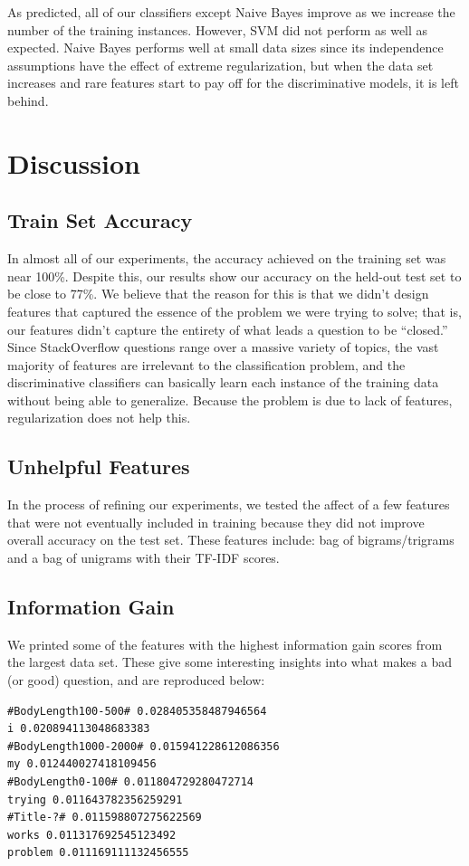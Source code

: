\documentclass[11pt]{article}
\begin{document}
As predicted, all of our classifiers except Naive Bayes improve as we increase the number
of the training instances. However, SVM did not perform as well as
expected. Naive Bayes performs well at small data sizes since its independence assumptions have the effect of extreme regularization, but when the data set increases and rare features start to pay off for the discriminative models, it is left behind.

\section{Discussion}

\subsection{Train Set Accuracy}
In almost all of our experiments, the accuracy achieved on the
training set was near 100\%.  Despite this, our results show our
accuracy on the held-out test set to be close to 77\%.  We believe
that the reason for this is that we didn't design features that
captured the essence of the problem we were trying to solve; that is,
our features didn't capture the entirety of what leads a question to
be ``closed.'' Since StackOverflow questions range over a massive variety of topics, the vast majority of features are irrelevant to the classification problem, and the discriminative classifiers can basically learn each instance of the training data without being able to generalize. Because the problem is due to lack of features, regularization does not help this.

\subsection{Unhelpful Features}
In the process of refining our experiments, we tested the affect of a
few features that were not eventually included in training because
they did not improve overall accuracy on the test set. These features
include: bag of bigrams/trigrams and a bag of unigrams with their
TF-IDF scores.

\subsection{Information Gain}
We printed some of the features with the highest information gain scores from the largest data set. These give some interesting insights into what makes a bad (or good) question, and are reproduced below:
\begin{verbatim}
#BodyLength100-500# 0.028405358487946564
i 0.020894113048683383
#BodyLength1000-2000# 0.015941228612086356
my 0.012440027418109456
#BodyLength0-100# 0.011804729280472714
trying 0.011643782356259291
#Title-?# 0.011598807275622569
works 0.011317692545123492
problem 0.011169111132456555
\end{verbatim}
\end{document}
